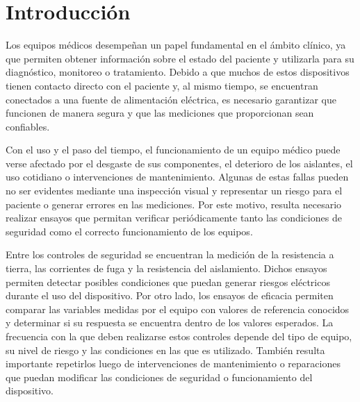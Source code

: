 \section{Introducción}


Los equipos médicos desempeñan un papel fundamental en el ámbito clínico, ya que permiten obtener información sobre
 el estado del paciente y utilizarla para su diagnóstico, monitoreo o tratamiento. Debido a que muchos de estos 
dispositivos tienen contacto directo con el paciente y, al mismo tiempo, se encuentran conectados a una fuente de
alimentación eléctrica, es necesario garantizar que funcionen de manera segura y que las mediciones que proporcionan
 sean confiables.

Con el uso y el paso del tiempo, el funcionamiento de un equipo médico puede verse afectado por el desgaste de sus 
componentes, el deterioro de los aislantes, el uso cotidiano o intervenciones de mantenimiento. Algunas de estas fallas
 pueden no ser evidentes mediante una inspección visual y representar un riesgo para el paciente o generar 
errores en las mediciones. Por este motivo, resulta necesario realizar ensayos que permitan verificar periódicamente tanto
 las condiciones de seguridad como el correcto funcionamiento de los equipos.

Entre los controles de seguridad se encuentran la medición de la resistencia a tierra, las corrientes de fuga 
y la resistencia del aislamiento. Dichos ensayos permiten detectar posibles condiciones que puedan generar riesgos
 eléctricos durante el uso del dispositivo. Por otro lado, los ensayos de eficacia permiten comparar las variables medidas
 por el equipo con valores de referencia conocidos y determinar si su respuesta se encuentra dentro de los valores esperados.
 La frecuencia con la que deben realizarse estos controles depende del tipo de equipo, su nivel de riesgo y las condiciones
 en las que es utilizado. También resulta importante repetirlos luego de intervenciones de mantenimiento o reparaciones
 que puedan modificar las condiciones de seguridad o funcionamiento del dispositivo.
